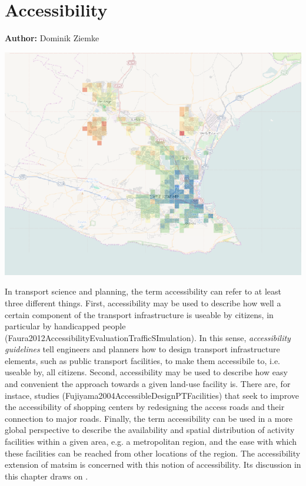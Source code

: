 \chapter{Accessibility}
\label{ch:accessibility}

\hfill \textbf{Author:} Dominik Ziemke

\begin{center} \includegraphics[width=1.\textwidth, angle=0]{extending/figures/accessibility/w_freeSpeed_snapshot.png} \end{center}



In transport science and planning, the term accessibility can refer to at least three different things. First, accessibility may be used to describe how well a certain component of the transport infrastructure is useable by citizens, in particular by handicapped people (Faura2012AccessibilityEvaluationTrafficSImulation). In this sense, \textit{accessibility guidelines} tell engineers and planners how to design transport infrastructure elements, such as public transport facilities, to make them accessibile to, i.e. useable by, all citizens. Second, accessibility may be used to describe how easy and convenient the approach towards a given land-use facility is. There are, for instace, studies (Fujiyama2004AccessibleDesignPTFacilities) that seek to improve the accessibility of shopping centers by redesigning the access roads and their connection to major roads. Finally, the term accessibility can be used in a more global perspective to describe the availability and spatial distribution of activity facilities within a given area, e.g. a metropolitan region, and the ease with which these facilities can be reached from other locations of the region. The accessibility extension of \gls{matsim} is concerned with this notion of accessibility. Its discussion in this chapter draws on \citet{NicolaiNagel2012HiResAccessibilityMethodInBook}.

